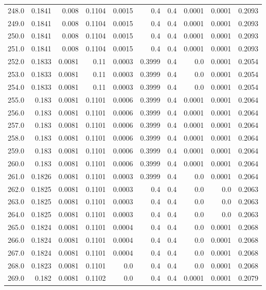 \begin{longtable}{lrrrrrrrrr}
248.0 & 0.1841 & 0.008 & 0.1104 & 0.0015 & 0.4 & 0.4 & 0.0001 & 0.0001 & 0.2093 \\
249.0 & 0.1841 & 0.008 & 0.1104 & 0.0015 & 0.4 & 0.4 & 0.0001 & 0.0001 & 0.2093 \\
250.0 & 0.1841 & 0.008 & 0.1104 & 0.0015 & 0.4 & 0.4 & 0.0001 & 0.0001 & 0.2093 \\
251.0 & 0.1841 & 0.008 & 0.1104 & 0.0015 & 0.4 & 0.4 & 0.0001 & 0.0001 & 0.2093 \\
252.0 & 0.1833 & 0.0081 & 0.11 & 0.0003 & 0.3999 & 0.4 & 0.0 & 0.0001 & 0.2054 \\
253.0 & 0.1833 & 0.0081 & 0.11 & 0.0003 & 0.3999 & 0.4 & 0.0 & 0.0001 & 0.2054 \\
254.0 & 0.1833 & 0.0081 & 0.11 & 0.0003 & 0.3999 & 0.4 & 0.0 & 0.0001 & 0.2054 \\
255.0 & 0.183 & 0.0081 & 0.1101 & 0.0006 & 0.3999 & 0.4 & 0.0001 & 0.0001 & 0.2064 \\
256.0 & 0.183 & 0.0081 & 0.1101 & 0.0006 & 0.3999 & 0.4 & 0.0001 & 0.0001 & 0.2064 \\
257.0 & 0.183 & 0.0081 & 0.1101 & 0.0006 & 0.3999 & 0.4 & 0.0001 & 0.0001 & 0.2064 \\
258.0 & 0.183 & 0.0081 & 0.1101 & 0.0006 & 0.3999 & 0.4 & 0.0001 & 0.0001 & 0.2064 \\
259.0 & 0.183 & 0.0081 & 0.1101 & 0.0006 & 0.3999 & 0.4 & 0.0001 & 0.0001 & 0.2064 \\
260.0 & 0.183 & 0.0081 & 0.1101 & 0.0006 & 0.3999 & 0.4 & 0.0001 & 0.0001 & 0.2064 \\
261.0 & 0.1826 & 0.0081 & 0.1101 & 0.0003 & 0.3999 & 0.4 & 0.0 & 0.0001 & 0.2064 \\
262.0 & 0.1825 & 0.0081 & 0.1101 & 0.0003 & 0.4 & 0.4 & 0.0 & 0.0 & 0.2063 \\
263.0 & 0.1825 & 0.0081 & 0.1101 & 0.0003 & 0.4 & 0.4 & 0.0 & 0.0 & 0.2063 \\
264.0 & 0.1825 & 0.0081 & 0.1101 & 0.0003 & 0.4 & 0.4 & 0.0 & 0.0 & 0.2063 \\
265.0 & 0.1824 & 0.0081 & 0.1101 & 0.0004 & 0.4 & 0.4 & 0.0 & 0.0001 & 0.2068 \\
266.0 & 0.1824 & 0.0081 & 0.1101 & 0.0004 & 0.4 & 0.4 & 0.0 & 0.0001 & 0.2068 \\
267.0 & 0.1824 & 0.0081 & 0.1101 & 0.0004 & 0.4 & 0.4 & 0.0 & 0.0001 & 0.2068 \\
268.0 & 0.1823 & 0.0081 & 0.1101 & 0.0 & 0.4 & 0.4 & 0.0 & 0.0001 & 0.2068 \\
269.0 & 0.182 & 0.0081 & 0.1102 & 0.0 & 0.4 & 0.4 & 0.0001 & 0.0001 & 0.2079 \\

\end{longtable}
